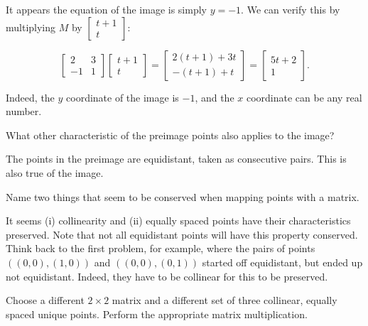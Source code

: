 \documentclass[../gatm_answers.tex]{subfiles}
\begin{document}
It appears the equation of the image is simply $y=-1$. We can verify this by multiplying $M$ by $\begin{bmatrix} t+1 \\ t \end{bmatrix}$:

$$\begin{bmatrix} 2 & 3 \\ -1 & 1 \end{bmatrix} \begin{bmatrix} t+1 \\ t \end{bmatrix} = \begin{bmatrix} 2(t+1) + 3t \\ -(t+1) + t \end{bmatrix} = \begin{bmatrix} 5t + 2 \\ 1 \end{bmatrix}.$$

Indeed, the $y$ coordinate of the image is $-1$, and the $x$ coordinate can be any real number.

\begin{inner_problem}
\item What other characteristic of the preimage points also applies to the image?
\end{inner_problem}

The points in the preimage are equidistant, taken as consecutive pairs. This is also true of the image.

\begin{inner_problem}
\item Name two things that seem to be conserved when mapping points with a matrix.
\end{inner_problem}

It seems (i) collinearity and (ii) equally spaced points have their characteristics preserved. Note that not all equidistant points will have this property conserved. Think back to the first problem, for example, where the pairs of points $((0,0),(1,0))$ and $((0,0),(0,1))$ started off equidistant, but ended up not equidistant. Indeed, they have to be collinear for this to be preserved.

\begin{outer_problem}
\item 
\end{outer_problem}

\begin{inner_problem}[start=1]
\item Choose a different $2\times 2$ matrix and a different set of three collinear, equally spaced unique points. Perform the appropriate matrix multiplication.
\end{inner_problem}
\end{document}

